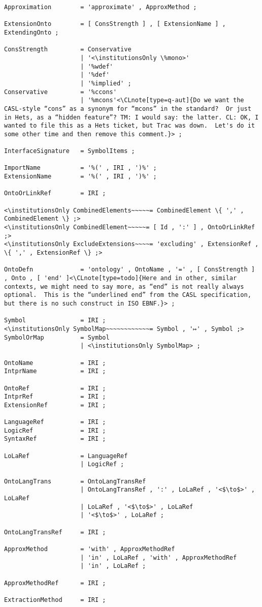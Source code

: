 \documentclass[%
\ifpretendfinal
final%
\else
draft%
\fi,
a4paper,
wd]{isov2}
\makeatletter
\newcommand*\CommentAuthor{}
\renewcommand*\CommentAuthor{#1}}
\newcommand*\CommentDate{}
\renewcommand*\CommentDate{#1}}
\newcommand*\CommentId{}
\renewcommand*\CommentId{#1}}
\newcommand*\CommentType{}
\renewcommand*\CommentType{#1}}
\newcommand*{\SetCommentColorByType}[1]{%
\edef\localType{{#1}}%
\expandafter\ifstrequal\localType{q-aut}{\colorlet{CommentColor}{red}}{%
\expandafter\ifstrequal\localType{q-all}{\colorlet{CommentColor}{orange}}{%
\expandafter\ifstrequal\localType{todo}{\colorlet{CommentColor}{orange}}{%
\expandafter\ifstrequal\localType{fyi}{\colorlet{CommentColor}{lightgray}}{%
\colorlet{CommentColor}{yellow}}}}}}
\newcommand*{\SetCommentPrefixByType}[1]{%
\edef\localType{{#1}}%
\expandafter\@ifmtarg\localType{%
\edef\CommentPrefix{}%
}{%
\caseupper[q]{#1}%
\edef\CommentPrefix{\thestring: }%
}}
\newcommand*{\initComment}[1]{%
\setkeys{Comment}{#1}%
\SetCommentColorByType{\CommentType}%
\relax%
\SetCommentPrefixByType{\CommentType}%
\relax%
}
\newcommand*{\todonote}[2][]{%
\initComment{#1}%
\pdfcomment[author=\CommentAuthor,color=CommentColor,date=\CommentDate,id=\CommentId]{%
\CommentPrefix
#2}}
\newcommand*{\todonote}[2][]{%
\initComment{#1}%
\ednote{\CommentPrefix #2}}
\newcommand*{\CLnote}[2][author=Christoph Lange]{%
\todonote[author=Christoph Lange,#1]{#2}}
\newcommand*{\institutionsOnly}{\bfseries\itshape}
\makeatother
\begin{document}
\begin{lstlisting}[language=ebnf,escapeinside={<>}]
Approximation        = 'approximate' , ApproxMethod ;

ExtensionOnto        = [ ConsStrength ] , [ ExtensionName ] , ExtendingOnto ;

ConsStrength         = Conservative
                     | '<\institutionsOnly \%mono>'
                     | '%wdef'
                     | '%def'
                     | '%implied' ;
Conservative         = '%ccons'
                     | '%mcons'<\CLnote[type=q-aut]{Do we want the CASL-style “cons” as a synonym for “mcons” in the standard?  Or just in Hets, as a “hidden feature”? TM: I would say: the latter. CL: OK, I wanted to file this as a Hets ticket, but Trac was down.  Let's do it some other time and then remove this comment.}> ;

InterfaceSignature   = SymbolItems ;

ImportName           = '%(' , IRI , ')%' ;
ExtensionName        = '%(' , IRI , ')%' ;

OntoOrLinkRef        = IRI ;

<\institutionsOnly CombinedElements~~~~~= CombinedElement \{ ',' , CombinedElement \} ;>
<\institutionsOnly CombinedElement~~~~~= [ Id , ':' ] , OntoOrLinkRef ;>
<\institutionsOnly ExcludeExtensions~~~~= 'excluding' , ExtensionRef , \{ ',' , ExtensionRef \} ;>

OntoDefn             = 'ontology' , OntoName , '=' , [ ConsStrength ] , Onto , [ 'end' ]<\CLnote[type=todo]{Here and in other, similar contexts, we might need to say more, as “end” is not really always optional.  This is the “underlined end” from the CASL specification, but there is no such construct in ISO EBNF.}> ;

Symbol               = IRI ;
<\institutionsOnly SymbolMap~~~~~~~~~~~~= Symbol , '↦' , Symbol ;>
SymbolOrMap          = Symbol
                     | <\institutionsOnly SymbolMap> ;

OntoName             = IRI ;
IntprName            = IRI ;

OntoRef              = IRI ;
IntprRef             = IRI ;
ExtensionRef         = IRI ;

LanguageRef          = IRI ;
LogicRef             = IRI ;
SyntaxRef            = IRI ;

LoLaRef              = LanguageRef
                     | LogicRef ;

OntoLangTrans        = OntoLangTransRef
                     | OntoLangTransRef , ':' , LoLaRef , '<$\to$>' , LoLaRef
                     | LoLaRef , '<$\to$>' , LoLaRef
                     | '<$\to$>' , LoLaRef ;

OntoLangTransRef     = IRI ;

ApproxMethod         = 'with' , ApproxMethodRef
                     | 'in' , LoLaRef , 'with' , ApproxMethodRef
                     | 'in' , LoLaRef ;

ApproxMethodRef      = IRI ;

ExtractionMethod     = IRI ;

\end{lstlisting}
\end{document}
